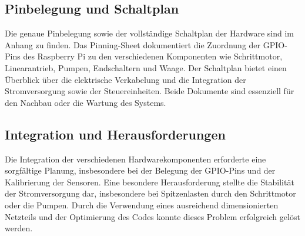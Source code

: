 \subsection{Pinbelegung und Schaltplan} Die genaue Pinbelegung sowie der vollständige Schaltplan der Hardware sind im Anhang zu finden. Das Pinning-Sheet dokumentiert die Zuordnung der GPIO-Pins des Raspberry Pi zu den verschiedenen Komponenten wie Schrittmotor, Linearantrieb, Pumpen, Endschaltern und Waage. Der Schaltplan bietet einen Überblick über die elektrische Verkabelung und die Integration der Stromversorgung sowie der Steuereinheiten. Beide Dokumente sind essenziell für den Nachbau oder die Wartung des Systems.

\subsection{Integration und Herausforderungen}
Die Integration der verschiedenen Hardwarekomponenten erforderte eine sorgfältige Planung, insbesondere bei der Belegung der GPIO-Pins und der Kalibrierung der Sensoren. Eine besondere Herausforderung stellte die Stabilität der Stromversorgung dar, insbesondere bei Spitzenlasten durch den Schrittmotor oder die Pumpen. Durch die Verwendung eines ausreichend dimensionierten Netzteils und der Optimierung des Codes konnte dieses Problem erfolgreich gelöst werden.
